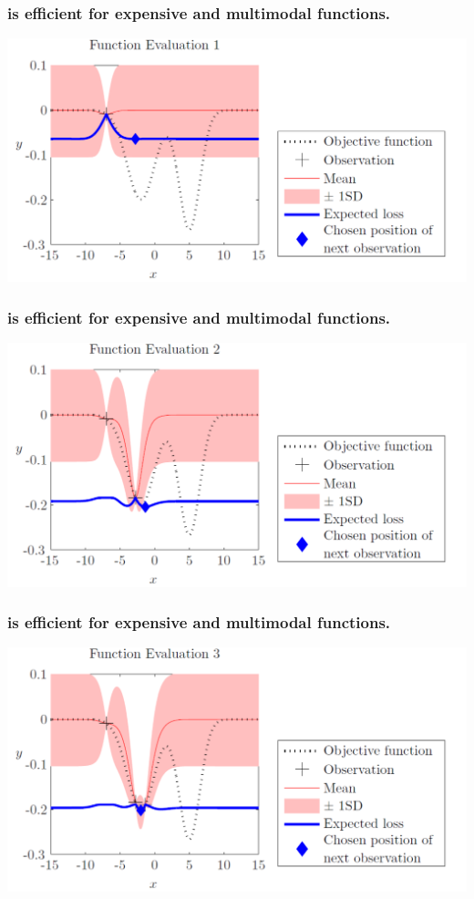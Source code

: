 \documentclass[12pt,onlymath]{beamer}
\begin{document}
\begin{frame}\frametitle{ is efficient for expensive and multimodal functions.}
\includegraphics[width = \textwidth]{./figures/bo1.pdf}
\end{frame}
\begin{frame}\frametitle{ is efficient for expensive and multimodal functions.}
\includegraphics[width = \textwidth]{./figures/bo2.pdf}
\end{frame}
\begin{frame}\frametitle{ is efficient for expensive and multimodal functions.}
\includegraphics[width = \textwidth]{./figures/bo3.pdf}
\end{frame}
\end{document}
